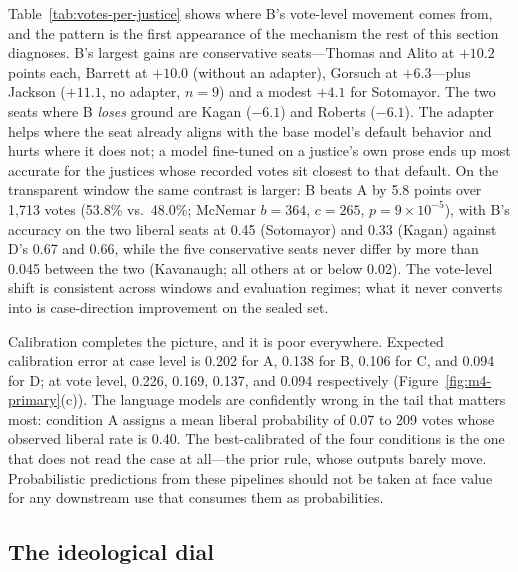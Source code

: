 Table~\ref{tab:votes-per-justice} shows where B's vote-level movement
comes from, and the pattern is the first appearance of the mechanism
the rest of this section diagnoses. B's largest gains are conservative
seats---Thomas and Alito at $+10.2$ points each, Barrett at $+10.0$
(without an adapter), Gorsuch at $+6.3$---plus Jackson ($+11.1$, no
adapter, $n=9$) and a modest $+4.1$ for Sotomayor. The two seats where
B \emph{loses} ground are Kagan ($-6.1$) and Roberts ($-6.1$). The
adapter helps where the seat already aligns with the base model's
default behavior and hurts where it does not; a model fine-tuned on a
justice's own prose ends up most accurate for the justices whose
recorded votes sit closest to that default. On the transparent window the same contrast is
larger: B beats A by 5.8 points over 1{,}713 votes (53.8\% vs.\
48.0\%; McNemar $b=364$, $c=265$, $p=9\times10^{-5}$), with B's
accuracy on the two liberal seats at 0.45 (Sotomayor) and 0.33 (Kagan)
against D's 0.67 and 0.66, while the five conservative seats never
differ by more than 0.045 between the two (Kavanaugh; all others at or
below 0.02). The vote-level shift is consistent
across windows and evaluation regimes; what it never converts into is
case-direction improvement on the sealed set.

Calibration completes the picture, and it is poor everywhere. Expected
calibration error at case level is 0.202 for A, 0.138 for B, 0.106
for C, and 0.094 for D; at vote level, 0.226, 0.169, 0.137, and
0.094 respectively (Figure~\ref{fig:m4-primary}(c)). The language
models are confidently wrong in the tail that matters most: condition
A assigns a mean liberal probability of 0.07 to 209 votes whose
observed liberal rate is 0.40. The best-calibrated of the four
conditions is the one that does not read the case at all---the prior
rule, whose outputs barely move. Probabilistic predictions from these
pipelines should not be taken at face value for any downstream use
that consumes them as probabilities.

\subsection{The ideological dial}\label{sec:dialsec}

